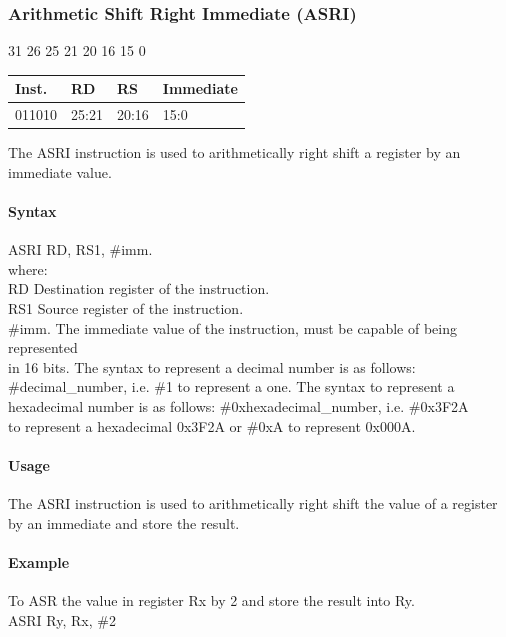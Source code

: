 \documentclass[12pt]{article}
\newcommand{\iTypeInstruction}[6]
{%
    \hspace{1.6cm}31 \hspace{1.15cm}26 \hspace{.05cm}25 \hspace{.8cm}21 \hspace{.05cm}20 \hspace{.8cm}16 \hspace{.05cm}15 \hspace{6.4cm}0
    \vspace{-.25cm}
    \begin{center}
        \begin{tabular}{ |p{1.8cm}|p{1.5cm}|p{1.5cm}|p{6.8cm}| }
            \hline
            \textbf{Inst.} & \textbf{RD} &  \textbf{RS} & \textbf{Immediate}\\
            \hline
            #1 & 25:21 & 20:16 &15:0\\
            \hline
        \end{tabular}
    \end{center}
    
    \noindent
    #2
    
    \paragraph{Syntax}
    \begin{flushleft}
    #3 RD, RS1, \#imm.\\
    \vspace{1em}        %
    where:\\
    \vspace{1em}
    RD  \hspace{3.6em} Destination register of the instruction.\\
    \vspace{1em}
    RS1  \hspace{3.35em} Source register of the instruction.\\
    \vspace{1em}
    \#imm.  \hspace{1.8em} The immediate value of the instruction, must be capable of being represented\\             \hspace{5.4em} in 16 bits. The syntax to represent a decimal number is as follows:\\
            \hspace{5.4em} \#decimal\_number, i.e. \#1 to represent a one. The syntax to represent a\\
            \hspace{5.4em} hexadecimal number is as follows: \#0xhexadecimal\_number, i.e. \#0x3F2A \\
            \hspace{5.4em} to represent a hexadecimal 0x3F2A or \#0xA to represent 0x000A.\\
    \end{flushleft}
    
    \paragraph{Usage}
    \begin{flushleft}
    #4\\
    \end{flushleft}
    \paragraph{Example}
    \begin{flushleft}
    #5\\
    \vspace{1em}
    #6
    \end{flushleft}}
\begin{document}



    \newpage
    \subsubsection{Arithmetic Shift Right Immediate (ASRI)}
    
    \iTypeInstruction
    {011010}
    {The ASRI instruction is used to arithmetically right shift a register by an immediate value.}
    {ASRI}
    {The ASRI instruction is used to arithmetically right shift the value of a register by an immediate and store the result.}
    {To ASR the value in register Rx by 2 and store the result into Ry.}
    {ASRI Ry, Rx, \#2}
    
    
    
\end{document}
